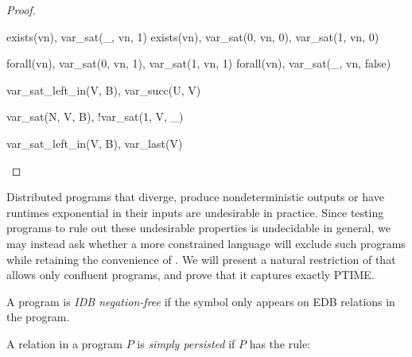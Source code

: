 \begin{proof}
\begin{Drules}
        {exists(vn), var_sat(_, vn, 1)}
        {exists(vn), var_sat(0, vn, 0), var_sat(1, vn, 0)}
\end{Drules}

\begin{Drules}
        {forall(vn), var_sat(0, vn, 1), var_sat(1, vn, 1)}
        {forall(vn), var_sat(_, vn, false)}
\end{Drules}

\begin{Drules}
        {var_sat_left_in(V, B), var_succ(U, V)}
\end{Drules}

\begin{Drules}
        {var_sat(N, V, B), !var_sat(1, V, _)}
\end{Drules}

\begin{Drules}
        {var_sat_left_in(V, B), var_last(V)}
\end{Drules}
\end{proof}



Distributed programs that diverge, produce nondeterministic outputs or have
runtimes exponential in their inputs are undesirable in practice.  Since testing
\lang programs to rule out these undesirable properties is undecidable in
general, we may instead ask whether a more constrained language will exclude
such programs while retaining the convenience of \lang.  We will present a
natural restriction of \lang that allows only confluent programs, and prove that
it captures exactly PTIME.

\begin{definition}
A \lang program is {\em IDB negation-free} if the \dedalus{!} symbol only appears on EDB relations in the program.
\end{definition}

\begin{definition}
A relation  in a program $P$ is {\em simply persisted} if $P$ has the rule: 
\end{definition}

